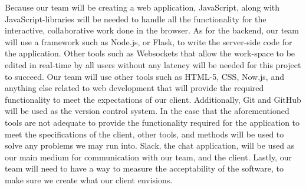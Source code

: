 \documentclass[onecolumn, draftclsnofoot,10pt, compsoc]{IEEEtran}
\begin{document}
Because our team will be creating a web application, JavaScript, along with JavaScript-libraries will be needed to handle all the functionality for the interactive, collaborative work done in the browser. As for the backend, our team will use a framework such as Node.js, or Flask, to write the server-side code for the application. Other tools such as Websockets that allow the work-space to be edited in real-time by all users without any latency will be needed for this project to succeed. Our team will use other tools such as HTML-5, CSS, Now.js, and anything else related to web development that will provide the required functionality to meet the expectations of our client. Additionally, Git and GitHub will be used as the version control system. In the case that the aforementioned tools are not adequate to provide the functionality required for the application to meet the specifications of the client, other tools, and methods will be used to solve any problems we may run into. Slack, the chat application, will be used as our main medium for communication with our team, and the client. Lastly, our team will need to have a way to measure the acceptability of the software, to make sure we create what our client envisions.
\end{document}
